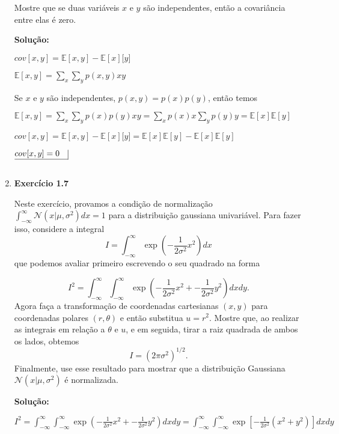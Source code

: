 \begin{enumerate}
Mostre que se duas variáveis $x$ e $y$ são independentes, então a covariância entre elas é zero.
\newline \par
\textbf{Solução:}

$cov[x,y]=\mathbb{E}[x,y]-\mathbb{E}[x]\mathbb[y]$

$\mathbb{E}[x,y]=\sum_x \sum_y p(x,y) x y$

Se $x$ e $y$ são independentes, $p(x,y)=p(x)p(y)$, então temos

$\mathbb{E}[x,y]=\sum_x \sum_y p(x)p(y) x y = \sum_x p(x) x  \sum_y p(y) y = \mathbb{E}[x]\mathbb{E}[y]$

$cov[x,y]=\mathbb{E}[x,y]-\mathbb{E}[x]\mathbb[y] = \mathbb{E}[x]\mathbb{E}[y] - \mathbb{E}[x]\mathbb{E}[y]$

$\underline{cov[x,y] = 0\quad} \vline$

$ $

\item \textbf{Exercício 1.7} \par

Neste exercício, provamos a condição de normalização $\int_{-\infty}^{\infty}\mathcal{N}(x | \mu, \sigma^2) dx = 1 $ para a distribuição gaussiana univariável. Para fazer isso, considere a integral
\begin{equation*}
    I = \int_{-\infty}^{\infty}\exp\left(-\frac{1}{2\sigma^2}x^2\right)dx
\end{equation*}
que podemos avaliar primeiro escrevendo o seu quadrado na forma
\newline \par
\begin{equation*}
    I^2 = \int_{-\infty}^{\infty}\int_{-\infty}^{\infty}\exp\left(-\frac{1}{2\sigma^2}x^2 + -\frac{1}{2\sigma^2}y^2\right)dxdy.
\end{equation*}
Agora faça a transformação de coordenadas cartesianas $(x, y)$ para coordenadas polares $(r, \theta)$ e então substitua $u = r^2$. Mostre que, ao realizar as integrais em relação a $\theta$ e $u$, e em seguida, tirar a raiz quadrada de ambos os lados, obtemos
\begin{equation*}
    I = \left(2\pi\sigma^2\right)^{1/2}.
\end{equation*}
Finalmente, use esse resultado para mostrar que a distribuição Gaussiana $\mathcal{N}(x | \mu, \sigma^2)$ é normalizada.
\newline \par
\textbf{Solução:}


$I^2 = \int_{-\infty}^{\infty}\int_{-\infty}^{\infty}\exp\left(-\frac{1}{2\sigma^2}x^2 + -\frac{1}{2\sigma^2}y^2\right)dxdy = 
 \int_{-\infty}^{\infty}\int_{-\infty}^{\infty}\exp\left[-\frac{1}{2\sigma^2}(x^2+y^2) \right]dxdy $


\end{enumerate}
